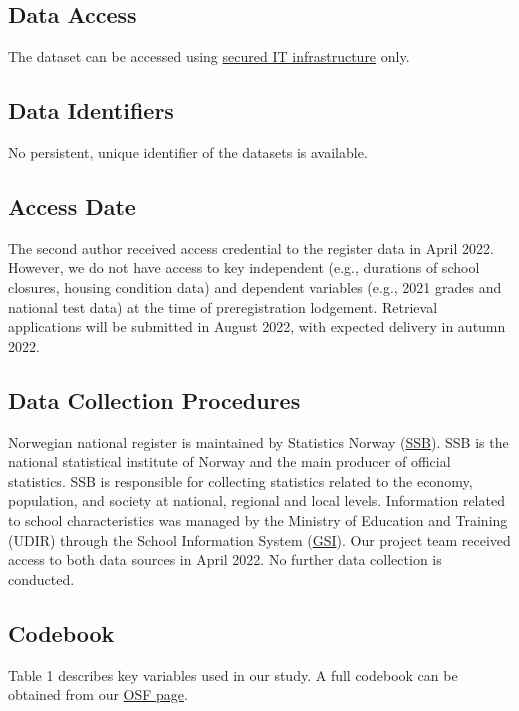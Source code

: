 \subsection{Data Access}
The dataset can be accessed using \href{https://www.uio.no/english/services/it/research/sensitive-data/}{secured IT infrastructure} only.

\subsection{Data Identifiers}
No persistent, unique identifier of the datasets is available.

\subsection{Access Date}
The second author received access credential to the register data in April 2022. However, we do not have access to key independent (e.g., durations of school closures, housing condition data) and dependent variables (e.g., 2021 grades and national test data) at the time of preregistration lodgement. Retrieval applications will be submitted in August 2022, with expected delivery in autumn 2022.

\subsection{Data Collection Procedures}
Norwegian national register is maintained by Statistics Norway (\href{https://www.ssb.no/en}{SSB}). SSB is the national statistical institute of Norway and the main producer of official statistics. SSB is responsible for collecting statistics related to the economy, population, and society at national, regional and local levels. Information related to school characteristics was managed by the Ministry of Education and Training (UDIR) through the School Information System (\href{https://gsi.udir.no}{GSI}). Our project team received access to both data sources in April 2022. No further data collection is conducted.

\subsection{Codebook}
Table 1 describes key variables used in our study. A full codebook can be obtained from our \href{https://osf.io/t6myh/?view_only=85ac0580daf54c44979de1b9ffe0c011}{OSF page}.
